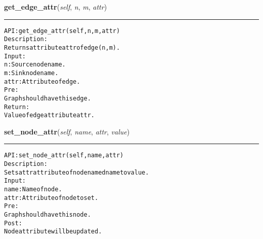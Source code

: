     \vspace{0.5ex}

\hspace{.8\funcindent}\begin{boxedminipage}{\funcwidth}

    \raggedright \textbf{get\_edge\_attr}(\textit{self}, \textit{n}, \textit{m}, \textit{attr})

    \vspace{-1.5ex}

    \rule{\textwidth}{0.5\fboxrule}
\setlength{\parskip}{2ex}
\begin{alltt}

API: get\_edge\_attr(self, n, m, attr)
Description:
Returns attribute attr of edge (n,m).
Input:
    n: Source node name.
    m: Sink node name.
    attr: Attribute of edge.
Pre:
    Graph should have this edge.
Return:
    Value of edge attribute attr.
\end{alltt}

\setlength{\parskip}{1ex}
    \end{boxedminipage}

    \label{coinor:gimpy:graph:Graph:set_node_attr}

    \vspace{0.5ex}

\hspace{.8\funcindent}\begin{boxedminipage}{\funcwidth}

    \raggedright \textbf{set\_node\_attr}(\textit{self}, \textit{name}, \textit{attr}, \textit{value})

    \vspace{-1.5ex}

    \rule{\textwidth}{0.5\fboxrule}
\setlength{\parskip}{2ex}
\begin{alltt}

API: set\_node\_attr(self, name, attr)
Description:
Sets attr attribute of node named name to value.
Input:
    name: Name of node.
    attr: Attribute of node to set.
Pre:
    Graph should have this node.
Post:
    Node attribute will be updated.
\end{alltt}

\setlength{\parskip}{1ex}
    \end{boxedminipage}

